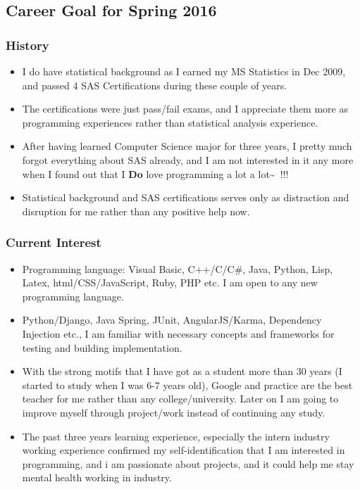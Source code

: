 \documentclass[9pt,b5paper]{article}
\begin{document}
\subsection{Career Goal for Spring 2016}
\label{sec-9-3}
\subsubsection{History}
\label{sec-9-3-1}
\begin{itemize}
\item I do have statistical background as I earned my MS Statistics in Dec 2009, and passed 4 SAS Certifications during these couple of years.
\item The certifications were just pass/fail exams, and I appreciate them more as programming experiences rather than statistical analysis experience.
\item After having learned Computer Science major for three years, I pretty much forgot everything about SAS already, and I am not interested in it any more when I found out that I \textbf{Do} love programming a lot a lot\textasciitilde{}~!!!
\item Statistical background and SAS certifications serves only as distraction and disruption for me rather than any positive help now.
\end{itemize}
\subsubsection{Current Interest}
\label{sec-9-3-2}
\begin{itemize}
\item Programming language: Visual Basic, C++/C/C\#, Java, Python, Lisp, Latex, html/CSS/JavaScript, Ruby, PHP etc. I am open to any new programming language.
\item Python/Django, Java Spring, JUnit, AngularJS/Karma, Dependency Injection etc., I am familiar with necessary concepts and frameworks for testing and building implementation.
\item With the strong motifs that I have got as a student more than 30 years (I started to study when I was 6-7  years old), Google and practice are the best teacher for me rather than any college/university. Later on I am going to improve myself through project/work instead of continuing any study.
\item The past three years learning experience, especially the intern industry working experience confirmed my self-identification that I am interested in programming, and i am passionate about projects, and it could help me stay mental health working in industry.
\end{itemize}
\end{document}
